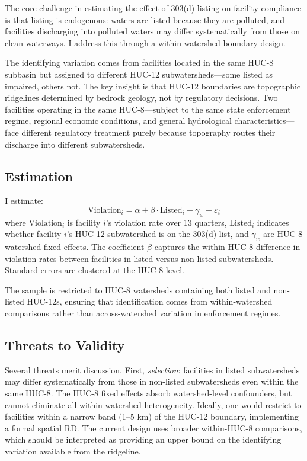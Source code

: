 \documentclass[12pt]{article}
\begin{document}
The core challenge in estimating the effect of 303(d) listing on facility compliance is that listing is endogenous: waters are listed because they are polluted, and facilities discharging into polluted waters may differ systematically from those on clean waterways. I address this through a within-watershed boundary design.

The identifying variation comes from facilities located in the same HUC-8 subbasin but assigned to different HUC-12 subwatersheds---some listed as impaired, others not. The key insight is that HUC-12 boundaries are topographic ridgelines determined by bedrock geology, not by regulatory decisions. Two facilities operating in the same HUC-8---subject to the same state enforcement regime, regional economic conditions, and general hydrological characteristics---face different regulatory treatment purely because topography routes their discharge into different subwatersheds.

\subsection{Estimation}

I estimate:
\begin{equation}
\text{Violation}_{i} = \alpha + \beta \cdot \text{Listed}_{i} + \gamma_w + \varepsilon_{i}
\label{eq:main}
\end{equation}
where $\text{Violation}_{i}$ is facility $i$'s violation rate over 13 quarters, $\text{Listed}_{i}$ indicates whether facility $i$'s HUC-12 subwatershed is on the 303(d) list, and $\gamma_w$ are HUC-8 watershed fixed effects. The coefficient $\beta$ captures the within-HUC-8 difference in violation rates between facilities in listed versus non-listed subwatersheds. Standard errors are clustered at the HUC-8 level.

The sample is restricted to HUC-8 watersheds containing both listed and non-listed HUC-12s, ensuring that identification comes from within-watershed comparisons rather than across-watershed variation in enforcement regimes.

\subsection{Threats to Validity}

Several threats merit discussion. First, \textit{selection}: facilities in listed subwatersheds may differ systematically from those in non-listed subwatersheds even within the same HUC-8. The HUC-8 fixed effects absorb watershed-level confounders, but cannot eliminate all within-watershed heterogeneity. Ideally, one would restrict to facilities within a narrow band (1--5 km) of the HUC-12 boundary, implementing a formal spatial RD. The current design uses broader within-HUC-8 comparisons, which should be interpreted as providing an upper bound on the identifying variation available from the ridgeline.
\end{document}
